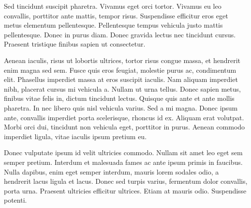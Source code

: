 Sed tincidunt suscipit pharetra. Vivamus eget orci tortor. Vivamus eu leo
convallis, porttitor ante mattis, tempor risus. Suspendisse efficitur eros eget
metus elementum pellentesque. Pellentesque tempus vehicula justo mattis
pellentesque. Donec in purus diam. Donec gravida lectus nec tincidunt cursus.
Praesent tristique finibus sapien ut consectetur.

Aenean iaculis, risus ut lobortis ultrices, tortor risus congue massa, et
hendrerit enim magna sed sem. Fusce quis eros feugiat, molestie purus ac,
condimentum elit. Phasellus imperdiet massa at eros suscipit iaculis. Nam
aliquam imperdiet nibh, placerat cursus mi vehicula a. Nullam ut urna tellus.
Donec sapien metus, finibus vitae felis in, dictum tincidunt lectus. Quisque
quis ante et ante mollis pharetra. In nec libero quis nisl vehicula varius. Sed
a mi magna. Donec ipsum ante, convallis imperdiet porta scelerisque, rhoncus id
ex. Aliquam erat volutpat. Morbi orci dui, tincidunt non vehicula eget,
porttitor in purus. Aenean commodo imperdiet ligula, vitae iaculis ipsum pretium
eu.

Donec vulputate ipsum id velit ultricies commodo. Nullam sit amet leo eget sem
semper pretium. Interdum et malesuada fames ac ante ipsum primis in faucibus.
Nulla dapibus, enim eget semper interdum, mauris lorem sodales odio, a hendrerit
lacus ligula et lacus. Donec sed turpis varius, fermentum dolor convallis, porta
urna. Praesent ultricies efficitur ultrices. Etiam at mauris odio. Suspendisse
potenti.

\newpage
